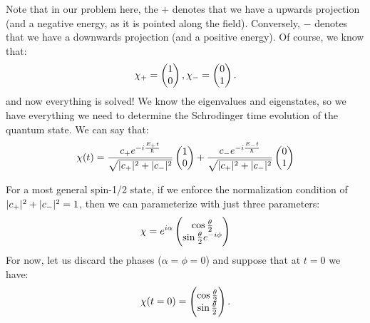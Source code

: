 Note that in our problem here, the $+$ denotes that we have a upwards projection (and a negative energy, as it is pointed along the field). Conversely, $-$ denotes that we have a downwards projection (and a positive energy). Of course, we know that:
\begin{equation}
    \chi_+ = \begin{pmatrix}1\\0\end{pmatrix}, \chi_- = \begin{pmatrix}0\\1\end{pmatrix}.
\end{equation}
and now everything is solved! We know the eigenvalues and eigenstates, so we have everything we need to determine the Schrodinger time evolution of the quantum state. We can say that:
\begin{equation}
    \chi(t) = \frac{c_+e^{-i\frac{E_+t}{\hbar}}}{\sqrt{\lvert c_+ \rvert^2 + \lvert c_- \rvert^2}}\begin{pmatrix}1\\0\end{pmatrix} + \frac{c_-e^{-i\frac{E_-t}{\hbar}}}{\sqrt{\lvert c_+ \rvert^2 + \lvert c_- \rvert^2}}\begin{pmatrix}0\\1\end{pmatrix}
\end{equation}

For a most general spin-1/2 state, if we enforce the normalization condition of $\lvert c_+ \rvert^2 + \lvert c_- \rvert^2 = 1$, then we can parameterize with just three parameters:
\begin{equation}
    \chi = e^{i\alpha}\m{\cos\frac{\theta}{2} \\ \sin\frac{\theta}{2}e^{-i\phi}}
\end{equation}
For now, let us discard the phases ($\alpha = \phi = 0$) and suppose that at $t = 0$ we have:
\begin{equation}
    \chi(t = 0) = \begin{pmatrix}\cos\frac{\theta}{2} \\ \sin\frac{\theta}{2}\end{pmatrix}.
\end{equation}


